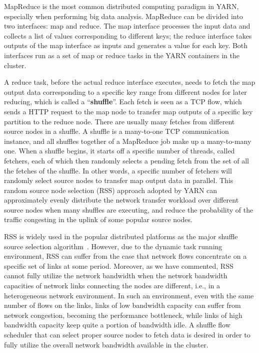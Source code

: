 \documentclass[10pt,journal,compsoc]{IEEEtran}
\begin{document}
MapReduce is the most common distributed computing paradigm in YARN,
especially when performing big data analysis. MapReduce can be divided
into two interfaces: map and reduce.
The map interface processes the input data and collects a list of
values corresponding to different keys;
the reduce interface takes outputs of the map interface as
inputs and generates a value for each key.
Both interfaces run as a set of map or reduce tasks in the YARN
containers in the cluster.

A reduce task, before the actual reduce interface executes,
needs to fetch the map output data corresponding to a specific key range from
different nodes for later reducing,
which is called a ``\textbf{shuffle}''.
Each fetch is seen as a TCP flow, which sends a HTTP request to the map node to transfer
map outputs of a specific key partition to the reduce node.
There are usually many fetches from different source nodes in a shuffle. 
A shuffle is a many-to-one TCP communication instance, 
and all shuffles together of a MapReduce job
make up a many-to-many one. 
When a shuffle begins, it starts off a specific number of threads, called
fetchers, each of which then randomly selects a pending fetch from the set
of all the fetches of the shuffle.
In other words, a specific number of fetchers will randomly select
source nodes to transfer map output data in parallel. 
This random source node selection (RSS) approach adopted by YARN can
approximately evenly distribute the network transfer workload
over different source nodes when many shuffles are executing, and reduce the probability of the traffic
congesting in the uplink of some popular source nodes.


RSS is widely used in the popular distributed platforms as the major shuffle 
source selection algorithm~\cite{zaharia2012resilient, vavilapalli2013apache}. 
However, due to the dynamic task running environment, 
RSS can suffer from the case that network flows concentrate on a specific 
set of links at some period.
Moreover, as we have commented,
RSS cannot fully utilize the network bandwidth
when the network bandwidth capacities of
network links connecting the nodes are different, i.e., in
a heterogeneous network environment.
In such an environment, even with the same number of flows on the links, 
links of low bandwidth capacity can suffer from network congestion, becoming the performance bottleneck,
while links of high bandwidth capacity keep quite a portion of bandwidth idle.
A shuffle flow scheduler that can select proper
source nodes to fetch data is desired in order
to fully utilize the overall network bandwidth available in the cluster. 
\end{document}
